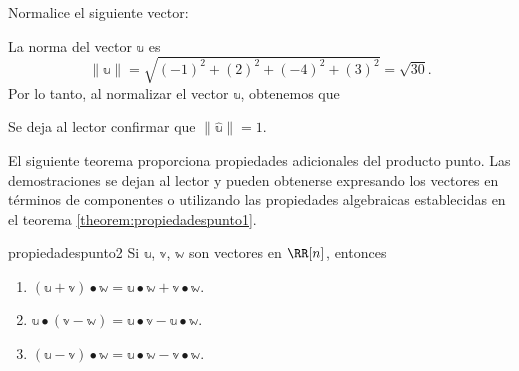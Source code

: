 \begin{examplebox}{}{}
    Normalice el siguiente vector:
    \begin{matrizn}
    \end{matrizn}

    \tcblower
    \solucion La norma del vector $\mathbb{u}$ es
    $$\| \mathbb{u} \| = \sqrt{(-1)^2 + (2)^2 + (-4)^2 + (3)^2} = \sqrt{30}.$$
    Por lo tanto, al normalizar el vector $\mathbb{u}$, obtenemos que
    \begin{matrizn}
    \end{matrizn}
    Se deja al lector confirmar que $\| \hat{\mathbb{u}} \| = 1$.
\end{examplebox}

El siguiente teorema proporciona propiedades adicionales del producto punto. Las demostraciones se dejan al lector y pueden obtenerse expresando los vectores en términos de componentes o utilizando las propiedades algebraicas establecidas en el teorema \ref{theorem:propiedadespunto1}.

\begin{theorem}{}{propiedadespunto2}
    Si $\mathbb{u}$, $\mathbb{v}$, $\mathbb{w}$ son vectores en $\RR[n]$, entonces
    \begin{enumerate}[label=\roman*), topsep=6pt, itemsep=0pt]
        \item $(\mathbb{u} + \mathbb{v}) \bullet \mathbb{w} = \mathbb{u} \bullet \mathbb{w} + \mathbb{v} \bullet \mathbb{w}$.
        \item $\mathbb{u} \bullet (\mathbb{v} - \mathbb{w}) = \mathbb{u} \bullet \mathbb{v} - \mathbb{u} \bullet \mathbb{w}$.
        \item $(\mathbb{u} - \mathbb{v}) \bullet \mathbb{w} = \mathbb{u} \bullet \mathbb{w} - \mathbb{v} \bullet \mathbb{w}$.
    \end{enumerate}
\end{theorem}

